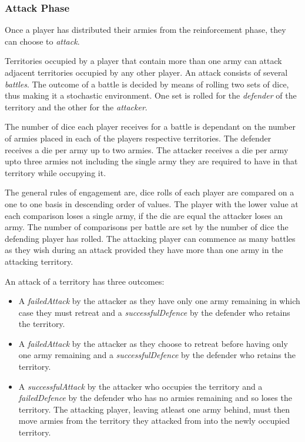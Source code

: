 \documentclass[parskip]{cs4rep}
\begin{document}
\subsubsection{Attack Phase}

Once a player has distributed their armies from the reinforcement phase, they can choose to \textit{attack}. 

Territories occupied by a player that contain more than one army can attack adjacent territories occupied by any other player. An attack consists of several \textit{battles}. The outcome of a battle is decided by means of rolling two sets of dice, thus making it a stochastic environment. One set is rolled for the \textit{defender} of the territory and the other for the \textit{attacker}. 

The number of dice each player receives for a battle is dependant on the number of armies placed in each of the players respective territories. The defender receives a die per army up to two armies. The attacker receives a die per army upto three armies not including the single army they are required to have in that territory while occupying it. 

The general rules of engagement are, dice rolls of each player are compared on a one to one basis in descending order of values. The player with the lower value at each comparison loses a single army, if the die are equal the attacker loses an army. The number of comparisons per battle are set by the number of dice the defending player has rolled. The attacking player can commence as many battles as they wish during an attack provided they have more than one army in the attacking territory.

An attack of a territory has three outcomes:

\begin{itemize}
\item
A \textit{failedAttack} by the attacker as they have only one army remaining in which case they must retreat and a \textit{successfulDefence} by the defender who retains the territory.
\item
A \textit{failedAttack} by the attacker as they choose to retreat before having only one army remaining and a \textit{successfulDefence} by the defender who retains the territory.
\item
A \textit{successfulAttack} by the attacker who occupies the territory and a \textit{failedDefence} by the defender who has no armies remaining and so loses the territory. The attacking player, leaving atleast one army behind, must then move armies from the territory they attacked from into the newly occupied territory.
\end{itemize}
\end{document}
